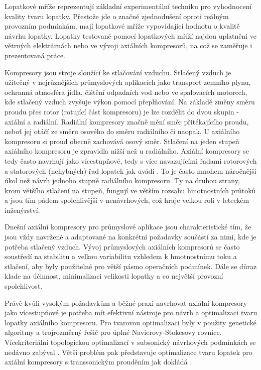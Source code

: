 Lopatkové mříže reprezentují základní experimentální techniku pro vyhodnocení kvality tvaru lopatky. 
Přestože jde o značné zjednodušení oproti reálným provozním podmínkám, mají lopatkové mříže vypovídající hodnotu o kvalitě návrhu lopatky\cite{steinert1990design}. 
Lopatky testované pomocí lopatkových mříží najdou uplatnění ve větrných elektrárnách\cite{jafari2018aerodynamic} nebo ve vývoji axiálních kompresorů\cite{hobbs1983development}, na což se zaměřuje i prezentovaná práce.

Kompresory jsou stroje sloužící ke stlačování vzduchu. Stlačený vzduch je užitečný v nejrůznějších průmyslových aplikacích jako transport zemního plynu, ochranná atmosféra jídla, čištění odpadních vod\cite{dalbert1999radial} nebo ve spalovacích motorech, kde stlačený vzduch zvyšuje výkon pomocí přeplňování. 
Na základě změny směru proudu přes rotor (rotující část kompresoru) je lze rozdělit do dvou skupin - axiální a radiální\cite{cumpsty1989compressor}. 
Radiální kompresory značně mění směr přitékajícího proudu, neboť jej otáčí ze směru osového do směru radiálního či naopak. 
U axiálního kompresoru si proud obecně zachovává osový směr. 
Stlačení na jeden stupeň axiálního kompresoru je zpravidla nižší než u radiálního. 
Axiální kompresory se tedy často navrhují jako vícestupňové, tedy s více navazujícími řadami rotorových a statorových (nehybných) řad lopatek jak uvádí \cite{Farokhi2014_propulsion}. 
To je často mnohem náročnější úkol než návrh jednoho stupně radiálního kompresoru. 
Ty na druhou strany, krom většího stlačení na stupeň, fungují ve větším rozsahu hmotnostních průtoků\cite{Xu_2006} a jsou tím pádem spolehlivější v nenávrhových, což hraje velkou roli v leteckém inženýrství\cite{kovavr2021searching}.

Dnešní axiální kompresory pro průmyslové aplikace jsou charakteristické tím, že jsou vždy navržené a adaptované na konkrétní požadavky součástí za nimi, kde je potřeba stlačený vzduch\cite{steinert1990design}. 
Vývoj průmyslových axiálních kompresorů se často soustředí na stabilitu a velkou variabilitu vzhledem k hmotnostnímu toku a stlačení, aby byly použitelné pro větší pásmo operačních podmínek. 
Dále se důraz klade na účinnost, minimalizaci velikosti lopatky a co největší provozní spolehlivost. 

Právě kvůli vysokým požadavkům a běžné praxi navrhovat axiální kompresory jako vícestupňové je potřeba mít efektivní nástroje pro návrh a optimalizaci tvaru lopatky axiálního kompresoru. 
Pro tvarovou optimalizaci byly v \cite{lotfi2006shape} použity genetické algoritmy a trojrozměrný řešič pro úplné Navierovy-Stokesovy rovnice.
Vícekriteriální topologickou optimalizací v subsonický návrhových podmínkách se nedávno zabýval \cite{blinov2019multi}. 
Větší problém pak představuje optimalizace tvaru lopatek pro axiální kompresory s transsonickým prouděním jak dokládá \cite{song2014blade}. 

